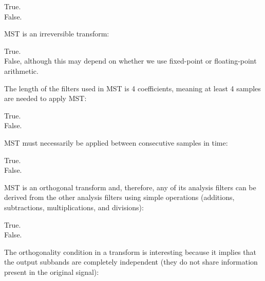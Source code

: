 \documentclass[legalpaper, 12pt, addpoints]{exam}
\begin{document}
\begin{questions}
\begin{oneparchoices}
  \choice True.\\
  \choice False.
\end{oneparchoices}
  
\vspace{0.10in}

\question MST is an irreversible transform:

\begin{oneparchoices}
  \choice True.\\
  \choice False, although this may depend on whether we use fixed-point or floating-point arithmetic.
\end{oneparchoices}
  
\vspace{0.10in}

\question The length of the filters used in MST is 4 coefficients, meaning at least 4 samples are needed to apply MST:

\begin{oneparchoices}
  \choice True.\\
  \choice False.
\end{oneparchoices}
  
\vspace{0.10in}

\question MST must necessarily be applied between consecutive samples in time:

\begin{oneparchoices}
  \choice True.\\
  \choice False.
\end{oneparchoices}
  
\vspace{0.10in}

\question MST is an orthogonal transform and, therefore, any of its analysis filters can be derived from the other analysis filters using simple operations (additions, subtractions, multiplications, and divisions):

\begin{oneparchoices}
  \choice True.\\
  \choice False.
\end{oneparchoices}
  
\vspace{0.10in}

\question The orthogonality condition in a transform is interesting because it implies that the output subbands are completely independent (they do not share information present in the original signal):


\end{questions}
\end{document}
